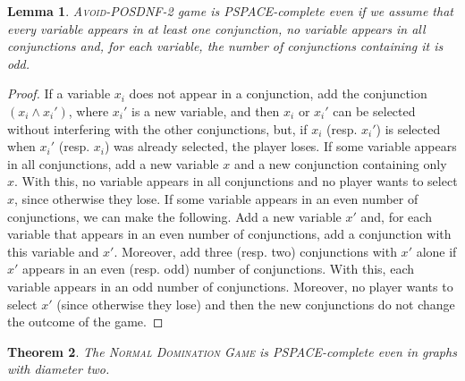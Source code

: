 \documentclass[12pt]{article}
\newtheorem{theorem}{Theorem}[section]
\newtheorem{lemma}[theorem]{Lemma}
\begin{document}
\begin{lemma}\label{lem.posdnf}
\textsc{Avoid-POSDNF-2} game is PSPACE-complete even if we assume that every variable appears in at least one conjunction, no variable appears in all conjunctions and, for each variable, the number of conjunctions containing it is odd.
\end{lemma}

\begin{proof}
If a variable $x_i$ does not appear in a conjunction, add the conjunction $(x_i\land x_i')$, where $x_i'$ is a new variable, and then $x_i$ or $x_i'$ can be selected without interfering with the other conjunctions, but, if $x_i$ (resp. $x_i'$) is selected when $x_i'$ (resp. $x_i$) was already selected, the player loses.
If some variable appears in all conjunctions, add a new variable $x$ and a new conjunction containing only $x$. With this, no variable appears in all conjunctions and no player wants to select $x$, since otherwise they lose.
If some variable appears in an even number of conjunctions, we can make the following. Add a new variable $x'$ and, for each variable that appears in an even number of conjunctions, add a conjunction with this variable and $x'$. Moreover, add three (resp. two) conjunctions with $x'$ alone if $x'$ appears in an even (resp. odd) number of conjunctions.
With this, each variable appears in an odd number of conjunctions. Moreover, no player wants to select $x'$ (since otherwise they lose) and then the new conjunctions do not change the outcome of the game.
\end{proof}


\begin{theorem}\label{thm-pspace-normal}
The \textsc{Normal Domination Game} is \emph{PSPACE}-complete even in graphs with diameter two.
\end{theorem}
\end{document}
